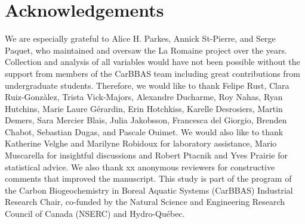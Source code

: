 \documentclass[12pt,a4paper]{article} %
\begin{document}
\section*{Acknowledgements}
We are especially grateful to Alice H. Parkes, Annick St-Pierre, and Serge Paquet, who maintained and oversaw the La Romaine project over the years. Collection and analysis of all variables would have not been possible without the support from members of the CarBBAS team including great contributions from undergraduate students. Therefore, we would like to thank Felipe Rust, Clara Ruiz-Gonz\`{a}lez, Trista Vick-Majors, Alexandre Ducharme, Roy Nahas, Ryan Hutchins, Marie Laure G\'{e}rardin,  Erin Hotchkiss, Karelle Desrosiers, Martin Demers, Sara Mercier Blais, Julia Jakobsson, Francesca del Giorgio, Brenden Chabot, Sebastian Dugas, and Pascale Ouimet. We would also like to thank Katherine Velghe and Marilyne Robidoux for laboratory assistance, Mario Muscarella for insightful discussions and Robert Ptacnik and Yves Prairie for statistical advice. We also thank xx anonymous reviewers for constructive comments that improved the manuscript. This study is part of the program of the Carbon Biogeochemistry in Boreal Aquatic Systems (CarBBAS) Industrial Research Chair, co-funded by the Natural Science and Engineering Research Council of Canada (NSERC) and Hydro-Qu\'{e}bec.

\newpage
\singlespacing



\newpage
\end{document}
